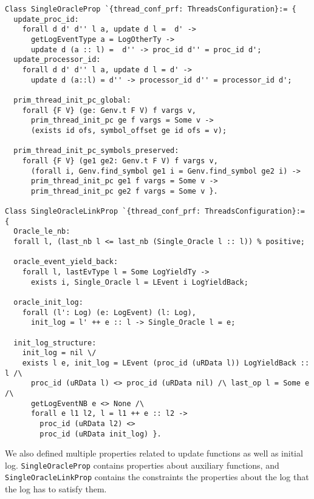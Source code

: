 \begin{lstlisting}
Class SingleOracleProp `{thread_conf_prf: ThreadsConfiguration}:= {
  update_proc_id:
    forall d d' d'' l a, update d l =  d' ->
      getLogEventType a = LogOtherTy ->
      update d (a :: l) =  d'' -> proc_id d'' = proc_id d';
  update_processor_id:
    forall d d' d'' l a, update d l = d' -> 
      update d (a::l) = d'' -> processor_id d'' = processor_id d';
       
  prim_thread_init_pc_global:
    forall {F V} (ge: Genv.t F V) f vargs v,
      prim_thread_init_pc ge f vargs = Some v ->
      (exists id ofs, symbol_offset ge id ofs = v);

  prim_thread_init_pc_symbols_preserved:
    forall {F V} (ge1 ge2: Genv.t F V) f vargs v,
      (forall i, Genv.find_symbol ge1 i = Genv.find_symbol ge2 i) ->
      prim_thread_init_pc ge1 f vargs = Some v ->
      prim_thread_init_pc ge2 f vargs = Some v }.

Class SingleOracleLinkProp `{thread_conf_prf: ThreadsConfiguration}:= {
  Oracle_le_nb: 
  forall l, (last_nb l <= last_nb (Single_Oracle l :: l)) % positive;

  oracle_event_yield_back:
    forall l, lastEvType l = Some LogYieldTy ->
      exists i, Single_Oracle l = LEvent i LogYieldBack;

  oracle_init_log:
    forall (l': Log) (e: LogEvent) (l: Log),
      init_log = l' ++ e :: l -> Single_Oracle l = e;
      
  init_log_structure:
    init_log = nil \/
    exists l e, init_log = LEvent (proc_id (uRData l)) LogYieldBack :: l /\
      proc_id (uRData l) <> proc_id (uRData nil) /\ last_op l = Some e /\
      getLogEventNB e <> None /\
      forall e l1 l2, l = l1 ++ e :: l2 ->
        proc_id (uRData l2) <> 
        proc_id (uRData init_log) }.
\end{lstlisting}
We also defined multiple properties related to 
update functions as well as initial log. 
\lstinline$SingleOracleProp$ contains properties about auxiliary functions, 
and \lstinline$SingleOracleLinkProp$  contains the constraints
the properties about the log that 
the log has to  satisfy them. 


